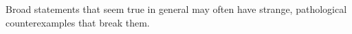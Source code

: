 \documentclass[12pt]{article}
\begin{document}
\begin{idea}
  Broad statements that seem true in general may often have strange,
  pathological counterexamples that break them. 
\end{idea}


\end{document}
